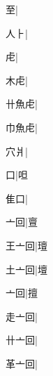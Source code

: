 \begin{multicols}{2}
{{\cjk{}{\cnsym{}　}{\cnsym{}　}至}|{}\par
{\cjk{}{\cnsym{}　}人{\cnrtwo{}⺊}}|{}\par
{虍}|{}\par
{\cjk{}{\cnsym{}　}木虍}|{}\par
{\cjk{}卄魚虍}|{}\par
{\cjk{}巾魚虍}|{}\par
{\cjk{}{\cnsym{}　}穴爿}|{}\par
{\cjk{}{\cnsym{}　}{\cnsym{}　}口}|{\cjk{}呾}\par
{\cjk{}{\cnsym{}　}隹口}|{}\par
{\cjk{}{\cnsym{}　}亠回}|{\cjk{}亶}\par
{\cjk{}王亠回}|{\cjk{}璮}\par
{\cjk{}土亠回}|{\cjk{}壇}\par
{亠回}|{\cjk{}擅}\par
{\cjk{}走亠回}|{}\par
{\cjk{}卄亠回}|{}\par
{\cjk{}革亠回}|{}\par
}
\end{multicols}
